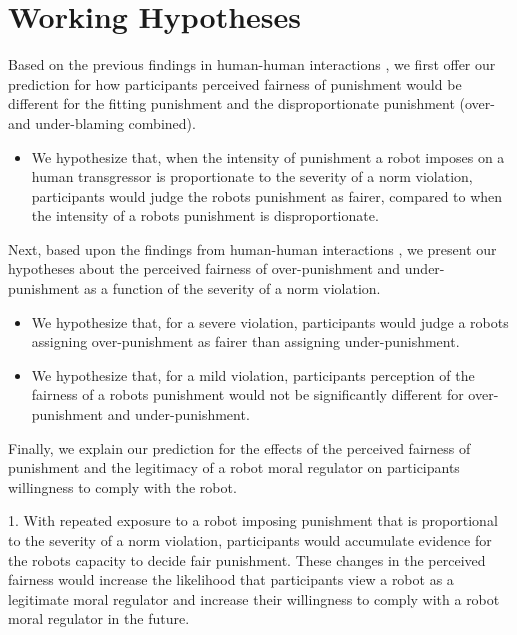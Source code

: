 \documentclass{article} %
\begin{document}
\section{Working Hypotheses}
Based on the previous findings in human-human interactions \cite{miller1981social,hogan1981retributive,ball1994just}, we first offer our prediction for how participants perceived fairness of punishment would be different for the fitting punishment and the disproportionate punishment (over- and under-blaming combined).
\begin{itemize}
\item We hypothesize that, when the intensity of punishment a robot imposes on a human transgressor is proportionate to the severity of a norm violation, participants would judge the robots punishment as fairer, compared to when the intensity of a robots punishment is disproportionate.
\end{itemize}

Next, based upon the findings from human-human interactions \cite{wagstaff1997overpunishment}, we present our hypotheses about the perceived fairness of over-punishment and under-punishment as a function of the severity of a norm violation.
\begin{itemize}
\item We hypothesize that, for a severe violation, participants would judge a robots assigning over-punishment as fairer than assigning under-punishment.
\item We hypothesize that, for a mild violation, participants perception of the fairness of a robots punishment would not be significantly different for over-punishment and under-punishment.
\end{itemize}

Finally, we explain our prediction for the effects of the perceived fairness of punishment and the legitimacy of a robot moral regulator on participants willingness to comply with the robot.
\begin{itemize}
1. With repeated exposure to a robot imposing punishment that is proportional to the severity of a norm violation, participants would accumulate evidence for the robots capacity to decide fair punishment. These changes in the perceived fairness would increase the likelihood that participants view a robot as a legitimate moral regulator and increase their willingness to comply with a robot moral regulator in the future.
\end{itemize}

\vspace{-1.58mm}
\vspace{-0.74mm}
\vspace{-2.31mm}
\end{document}
